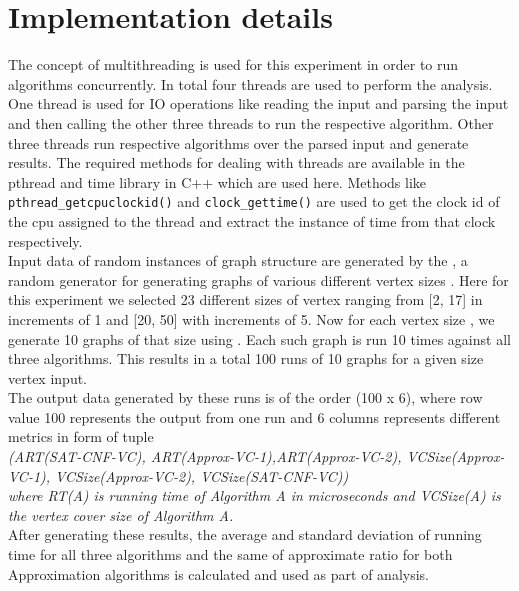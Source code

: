 \documentclass{article}
\begin{document}
\section{Implementation details}

The concept of multithreading is used for this experiment in order to run algorithms concurrently. In total four threads are used to perform the analysis. One thread is used for IO operations like reading the input and parsing the input and then calling the other three threads to run the respective algorithm. Other three threads run respective algorithms over the parsed input and generate results. The required methods for dealing with threads are available in the pthread and time library in C++ which are used here. Methods like \texttt{pthread\_getcpuclockid()} and \texttt{clock\_gettime()} are used to get the clock id of the cpu assigned to the thread and extract the instance of time from that clock respectively.\\

Input data of random instances of graph structure are generated by the , a random generator for generating graphs of various different vertex sizes . Here for this experiment we selected 23 different sizes of vertex  ranging from {[2, 17]} in increments of 1 and {[20, 50]} with increments of 5.  Now for each vertex size , we generate 10 graphs of that size using . Each such graph is run 10 times against all three algorithms. This results in a total 100 runs of 10 graphs for a given size vertex input. \\

The output data generated by these runs is of the order {(100 x 6)}, where row value 100 represents the output from one run and 6 columns represents different metrics in form of tuple\\

\textit{(ART(SAT-CNF-VC), ART(Approx-VC-1),ART(Approx-VC-2), \nobreak VCSize(Approx-VC-1), VCSize(Approx-VC-2), VCSize(SAT-CNF-VC))}  \\


\textit{where RT{(A)} is running time of Algorithm A in microseconds and VCSize{(A)} is the vertex cover size of Algorithm A.}\\

After generating these results, the average and standard deviation of running time for all three algorithms and the same of approximate ratio for both Approximation algorithms is calculated and used as part of analysis.
\end{document}

